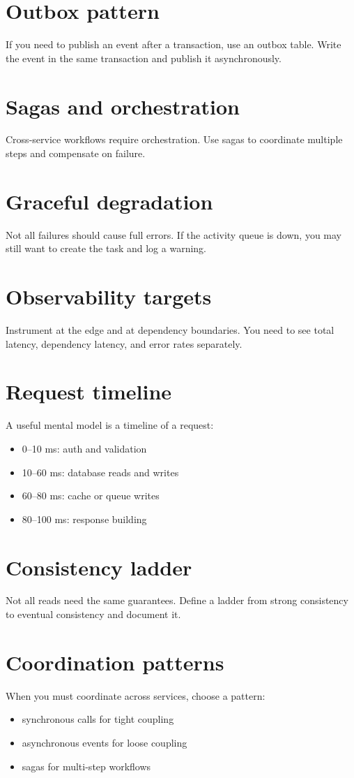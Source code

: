 \section{Outbox pattern}
If you need to publish an event after a transaction, use an outbox table.
Write the event in the same transaction and publish it asynchronously.

\section{Sagas and orchestration}
Cross-service workflows require orchestration.
Use sagas to coordinate multiple steps and compensate on failure.

\section{Graceful degradation}
Not all failures should cause full errors.
If the activity queue is down, you may still want to create the task and log a warning.

\section{Observability targets}
Instrument at the edge and at dependency boundaries.
You need to see total latency, dependency latency, and error rates separately.

\section{Request timeline}
A useful mental model is a timeline of a request:
\begin{itemize}[nosep]
  \item 0--10 ms: auth and validation
  \item 10--60 ms: database reads and writes
  \item 60--80 ms: cache or queue writes
  \item 80--100 ms: response building
\end{itemize}

\section{Consistency ladder}
Not all reads need the same guarantees.
Define a ladder from strong consistency to eventual consistency and document it.

\section{Coordination patterns}
When you must coordinate across services, choose a pattern:
\begin{itemize}[nosep]
  \item synchronous calls for tight coupling
  \item asynchronous events for loose coupling
  \item sagas for multi-step workflows
\end{itemize}

